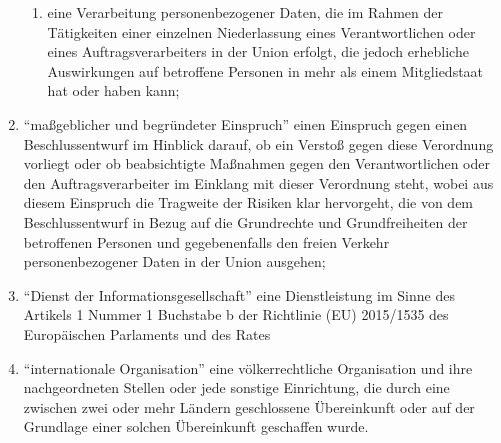 \begin{enumerate}[label=\arabic*.]
\begin{enumerate}[label=\alph*)]
                    \item eine Verarbeitung personenbezogener Daten, die im Rahmen der Tätigkeiten einer einzelnen Niederlassung eines Verantwortlichen oder eines Auftragsverarbeiters in der Union erfolgt, die jedoch erhebliche Auswirkungen auf betroffene Personen in mehr als einem Mitgliedstaat hat oder haben kann;
                \end{enumerate}              
            \item ``maßgeblicher und begründeter Einspruch'' einen Einspruch gegen einen Beschlussentwurf im Hinblick darauf, ob ein Verstoß gegen diese Verordnung vorliegt oder ob beabsichtigte Maßnahmen gegen den Verantwortlichen oder den Auftragsverarbeiter im Einklang mit dieser Verordnung steht, wobei aus diesem Einspruch die Tragweite der Risiken klar hervorgeht, die von dem Beschlussentwurf in Bezug auf die Grundrechte und Grundfreiheiten der betroffenen Personen und gegebenenfalls den freien Verkehr personenbezogener Daten in der Union ausgehen;
            \item ``Dienst der Informationsgesellschaft'' eine Dienstleistung im Sinne des Artikels 1 Nummer 1 Buchstabe b der Richtlinie (EU) 2015/1535 des Europäischen Parlaments und des Rates 
            \item ``internationale Organisation'' eine völkerrechtliche Organisation und ihre nachgeordneten Stellen oder jede sonstige Einrichtung, die durch eine zwischen zwei oder mehr Ländern geschlossene Übereinkunft oder auf der Grundlage einer solchen Übereinkunft geschaffen wurde. 
        \end{enumerate}
